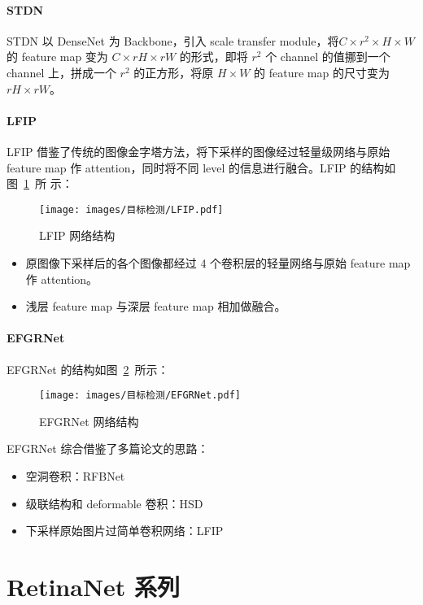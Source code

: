 \paragraph{STDN}
STDN 以 DenseNet 为 Backbone，引入 scale transfer module，将$C \times r^2 \times
H \times W$ 的 feature map 变为 $C \times rH \times rW$ 的形式，即将 $r^2$ 个
channel 的值挪到一个 channel 上，拼成一个 $r^2$ 的正方形，将原 $H \times
W$ 的 feature map 的尺寸变为 $rH \times rW$。

\paragraph{LFIP}
LFIP 借鉴了传统的图像金字塔方法，将下采样的图像经过轻量级网络与原始 feature map
作 attention，同时将不同 level 的信息进行融合。LFIP 的结构如图~\ref{fig:LFIP}~所
示：

\begin{figure}[ht]
  \centering
  \texttt{[image: images/目标检测/LFIP.pdf]}
  \caption{LFIP 网络结构}\label{fig:LFIP}
\end{figure}

\begin{itemize}
  \item 原图像下采样后的各个图像都经过 4 个卷积层的轻量网络与原始 feature map 作 attention。
  \item 浅层 feature map 与深层 feature map 相加做融合。
\end{itemize}

\paragraph{EFGRNet}
EFGRNet 的结构如图~\ref{fig:EFGRNet}~所示：

\begin{figure}[ht]
  \centering
  \texttt{[image: images/目标检测/EFGRNet.pdf]}
  \caption{EFGRNet 网络结构}\label{fig:EFGRNet}
\end{figure}

EFGRNet 综合借鉴了多篇论文的思路：
\begin{itemize}
  \item 空洞卷积：RFBNet 
  \item 级联结构和 deformable 卷积：HSD
  \item 下采样原始图片过简单卷积网络：LFIP
\end{itemize}

\section{RetinaNet 系列}
